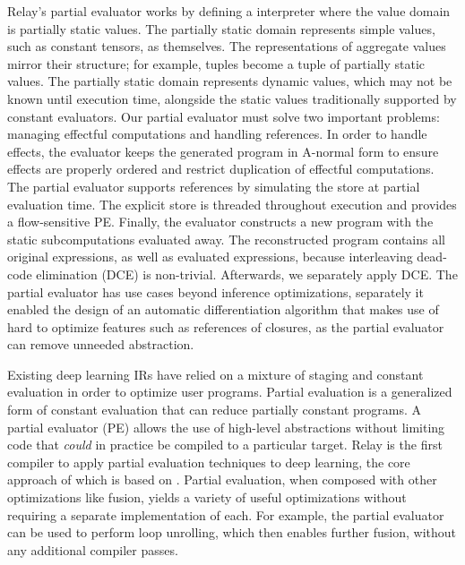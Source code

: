 Relay's partial evaluator works by defining a interpreter
  where the value domain is partially static values.
The partially static domain represents simple values,
  such as constant tensors, as themselves.
The representations
  of aggregate values mirror their structure; for example,
  tuples become a tuple of partially static values.
The partially static domain represents dynamic values,
  which may not be known until execution time,
  alongside the static values traditionally supported by
  constant evaluators.
Our partial evaluator must solve two important problems:
  managing effectful computations and handling references.
In order to handle effects, the evaluator keeps the generated
  program in A-normal form to ensure effects are properly ordered
  and restrict duplication of effectful computations.
The partial evaluator supports references by
  simulating the store at partial evaluation time.
The explicit store is threaded throughout execution
  and provides a flow-sensitive PE.
Finally, the evaluator constructs a new program with
  the static subcomputations evaluated away.
The reconstructed program contains all original
  expressions, as well as evaluated expressions,
  because interleaving dead-code elimination (DCE) is
  non-trivial.
Afterwards, we separately apply DCE.
The partial evaluator has use cases beyond inference
  optimizations, separately it enabled the design of an automatic
  differentiation algorithm that makes use of hard to optimize
  features such as references of closures, as the partial evaluator
  can remove unneeded abstraction.

  Existing deep learning IRs have relied on
  a mixture of staging and constant evaluation
  in order to optimize user programs.
Partial evaluation is a generalized form of constant
  evaluation that can reduce partially constant
  programs.
A partial evaluator (PE) allows the use of high-level abstractions
  without limiting code that \textit{could} in practice be
  compiled to a particular target.
Relay is the first compiler to apply partial evaluation
  techniques to deep learning, the
  core approach of which is based on \citep{pe_ref}.
Partial evaluation, when composed with other
  optimizations like fusion, yields a variety
  of useful optimizations without requiring
  a separate implementation of each.
For example, the partial evaluator can be used to perform
  loop unrolling, which then enables further fusion,
  without any additional compiler passes.


